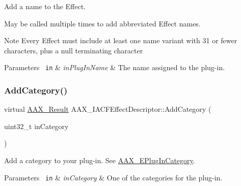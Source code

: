 Add a name to the Effect. 

May be called multiple times to add abbreviated Effect names.

\begin{DoxyNote}{Note}
Every Effect must include at least one name variant with 31 or fewer characters, plus a null terminating character
\end{DoxyNote}

\begin{DoxyParams}[1]{Parameters}
\mbox{\texttt{ in}}  & {\em in\+Plug\+In\+Name} & The name assigned to the plug-\/in. \\
\hline
\end{DoxyParams}
\mbox{\label{a01653_a415d749d8a464a56543733c5270a018c}} 
\subsubsection{\texorpdfstring{AddCategory()}{AddCategory()}}
{\footnotesize\ttfamily virtual \mbox{\hyperlink{a00392_a4d8f69a697df7f70c3a8e9b8ee130d2f}{A\+A\+X\+\_\+\+Result}} A\+A\+X\+\_\+\+I\+A\+C\+F\+Effect\+Descriptor\+::\+Add\+Category (\begin{DoxyParamCaption}\item[{uint32\+\_\+t}]{in\+Category }\end{DoxyParamCaption})\hspace{0.3cm}{\ttfamily [pure virtual]}}



Add a category to your plug-\/in. See \mbox{\hyperlink{a00491_aef9637518fb1ac0e2f403444c73aba4a}{A\+A\+X\+\_\+\+E\+Plug\+In\+Category}}. 


\begin{DoxyParams}[1]{Parameters}
\mbox{\texttt{ in}}  & {\em in\+Category} & One of the categories for the plug-\/in. \\
\hline
\end{DoxyParams}
\mbox{\label{a01653_af2f7f299d6012675960263812e7b31aa}} 
